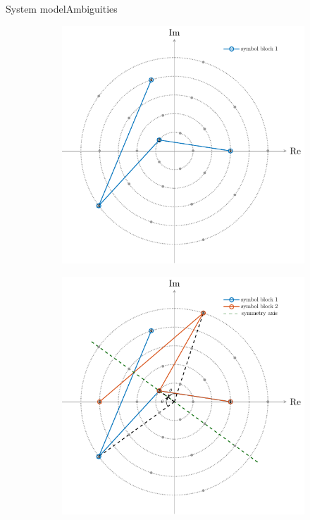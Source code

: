 \documentclass[en]{sdqbeamer}
\begin{document}
\begin{frame}{System model}{Ambiguities}
\begin{figure}[hub]
     \centering
     \begin{subfigure}[b]{0.4\textwidth}
         \centering
         \includegraphics[width=\textwidth]{Eq_class_construction_0.pdf}
     \end{subfigure}
     \hspace{10mm}
     \begin{subfigure}[b]{0.4\textwidth}
         \centering
         \includegraphics[width=\textwidth]{Eq_class_construction_1.pdf}
     \end{subfigure}
\end{figure}

\end{frame}
\end{document}
